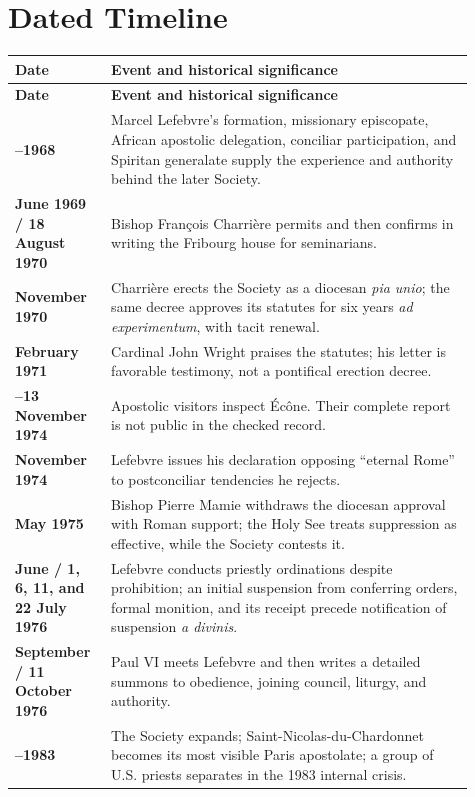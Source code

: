 \section{Dated Timeline}

\begin{longtable}{>{\bfseries\RaggedRight\arraybackslash}p{0.18\linewidth}>{\RaggedRight\arraybackslash}p{0.73\linewidth}}
\toprule
\textbf{Date} & \textbf{Event and historical significance}\\
\midrule
\endfirsthead
\toprule
\textbf{Date} & \textbf{Event and historical significance}\\
\midrule
\endhead
\bottomrule
\endfoot
1905--1968 & Marcel Lefebvre's formation, missionary episcopate, African apostolic delegation, conciliar participation, and Spiritan generalate supply the experience and authority behind the later Society.\\
6 June 1969 / 18 August 1970 & Bishop François Charrière permits and then confirms in writing the Fribourg house for seminarians.\\
1 November 1970 & Charrière erects the Society as a diocesan \emph{pia unio}; the same decree approves its statutes for six years \emph{ad experimentum}, with tacit renewal.\\
18 February 1971 & Cardinal John Wright praises the statutes; his letter is favorable testimony, not a pontifical erection decree.\\
11--13 November 1974 & Apostolic visitors inspect Écône. Their complete report is not public in the checked record.\\
21 November 1974 & Lefebvre issues his declaration opposing “eternal Rome” to postconciliar tendencies he rejects.\\
6 May 1975 & Bishop Pierre Mamie withdraws the diocesan approval with Roman support; the Holy See treats suppression as effective, while the Society contests it.\\
29 June / 1, 6, 11, and 22 July 1976 & Lefebvre conducts priestly ordinations despite prohibition; an initial suspension from conferring orders, formal monition, and its receipt precede notification of suspension \emph{a divinis}.\\
11 September / 11 October 1976 & Paul VI meets Lefebvre and then writes a detailed summons to obedience, joining council, liturgy, and authority.\\
1977--1983 & The Society expands; Saint-Nicolas-du-Chardonnet becomes its most visible Paris apostolate; a group of U.S. priests separates in the 1983 internal crisis.\\

\end{longtable}
